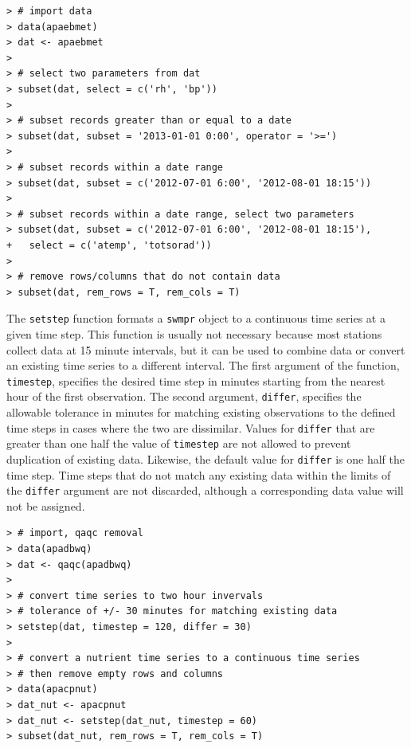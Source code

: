 \documentclass[10pt,letterpaper]{article}\usepackage[]{graphicx}\usepackage[]{color}
\makeatletter
\newenvironment{kframe}{%
 \def\at@end@of@kframe{}%
 \ifinner\ifhmode%
  \def\at@end@of@kframe{\end{minipage}}%
  \begin{minipage}{\columnwidth}%
 \fi\fi%
 \def\FrameCommand##1{\hskip\@totalleftmargin \hskip-\fboxsep
 \colorbox{shadecolor}{##1}\hskip-\fboxsep
     \hskip-\linewidth \hskip-\@totalleftmargin \hskip\columnwidth}%
 \MakeFramed {\advance\hsize-\width
   \@totalleftmargin\z@ \linewidth\hsize
   \@setminipage}}%
 {\par\unskip\endMakeFramed%
 \at@end@of@kframe}
\newenvironment{knitrout}{}{} %
\makeatother
\begin{document}
\begin{knitrout}\small
{}\color{fgcolor}\begin{kframe}
\begin{verbatim}
> # import data
> data(apaebmet)
> dat <- apaebmet
> 
> # select two parameters from dat
> subset(dat, select = c('rh', 'bp'))
> 
> # subset records greater than or equal to a date
> subset(dat, subset = '2013-01-01 0:00', operator = '>=')
> 
> # subset records within a date range
> subset(dat, subset = c('2012-07-01 6:00', '2012-08-01 18:15'))
> 
> # subset records within a date range, select two parameters
> subset(dat, subset = c('2012-07-01 6:00', '2012-08-01 18:15'),
+   select = c('atemp', 'totsorad'))
> 
> # remove rows/columns that do not contain data
> subset(dat, rem_rows = T, rem_cols = T)
\end{verbatim}
\end{kframe}
\end{knitrout}

The \texttt{setstep} function formats a \texttt{swmpr} object to a continuous time series at a given time step.  This function is usually not necessary because most stations collect data at 15 minute intervals, but it can be used to combine data or convert an existing time series to a different interval.  The first argument of the function, \texttt{timestep}, specifies the desired time step in minutes starting from the nearest hour of the first observation.  The second argument, \texttt{differ}, specifies the allowable tolerance in minutes for matching existing observations to the defined time steps in cases where the two are dissimilar.  Values for \texttt{differ} that are greater than one half the value of \texttt{timestep} are not allowed to prevent duplication of existing data.  Likewise, the default value for \texttt{differ} is one half the time step.  Time steps that do not match any existing data within the limits of the \texttt{differ} argument are not discarded, although a corresponding data value will not be assigned.

\begin{knitrout}\small
{}\color{fgcolor}\begin{kframe}
\begin{verbatim}
> # import, qaqc removal
> data(apadbwq)
> dat <- qaqc(apadbwq)
> 
> # convert time series to two hour invervals
> # tolerance of +/- 30 minutes for matching existing data
> setstep(dat, timestep = 120, differ = 30)
> 
> # convert a nutrient time series to a continuous time series
> # then remove empty rows and columns
> data(apacpnut)
> dat_nut <- apacpnut
> dat_nut <- setstep(dat_nut, timestep = 60)
> subset(dat_nut, rem_rows = T, rem_cols = T)
\end{verbatim}
\end{kframe}
\end{knitrout}
\end{document}
